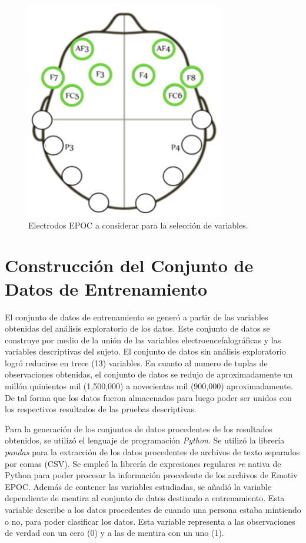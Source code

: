 \begin{figure}
    \centering
    \includegraphics[scale=0.92]{figuras/Imagen2.png}
    \caption{Electrodos EPOC a considerar para la selección de variables.}
    \label{fig:my_label}
\end{figure}

\section{Construcción del Conjunto de Datos de Entrenamiento}
El conjunto de datos de entrenamiento se generó a partir de las variables obtenidas del análisis exploratorio de los datos. Este conjunto de datos se construye por medio de la unión de las variables electroencefalográficas y las variables descriptivas del sujeto. El conjunto de datos sin análisis exploratorio logró reducirse en trece (13) variables. En cuanto al numero de tuplas de observaciones obtenidas, el conjunto de datos se redujo de aproximadamente un millón quinientos mil (1,500,000) a novecientas mil (900,000) aproximadamente. De tal forma que los datos fueron almacenados para luego poder ser unidos con los respectivos resultados de las pruebas descriptivas. 

Para la generación de los conjuntos de datos procedentes de los resultados obtenidos, se utilizó el lenguaje de programación \textit{Python}. Se utilizó la librería \textit{pandas} para la extracción de los datos procedentes de archivos de texto separados por comas (CSV). Se empleó la librería de expresiones regulares \textit{re} nativa de Python para poder procesar la información procedente de los archivos de Emotiv EPOC. Además de contener las variables estudiadas, se añadió la variable dependiente de mentira al conjunto de datos destinado a entrenamiento. Esta variable describe a los datos procedentes de cuando una persona estaba mintiendo o no, para poder clasificar los datos. Esta variable representa a las observaciones de verdad con un cero (0) y a las de mentira con un uno (1). 

